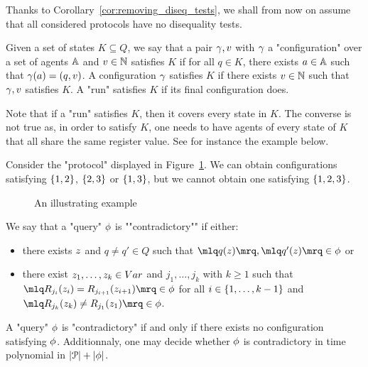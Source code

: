 Thanks to Corollary~\ref{cor:removing_diseq_tests}, we shall from now on assume that all considered protocols have no disequality tests. 

\begin{definition}
	Given a set of states $K \subseteq Q$, we say that a pair $\gamma, v$ with  $\gamma$ a "configuration" over a set of agents $\mathbb{A}$ and $v \in \mathbb{N}$ satisfies $K$ if for all $q \in K$, there exists $a \in \mathbb{A}$ such that $\gamma(a) = (q,v)$.
	A configuration $\gamma$ satisfies $K$ if there exists $v \in \mathbb{N}$ such that $\gamma, v $ satisfies $K$. 
	A "run" satisfies $K$ if its final configuration does.
\end{definition}
Note that if a "run" satisfies $K$, then it covers every state in $K$. The converse is not true as, in order to satisfy $K$, one needs to have agents of every state of $K$ that all share the same register value. See for instance the example below.

\begin{example}
	Consider the "protocol" displayed in Figure~\ref{fig:no-clique}.
	We can obtain configurations satisfying $\{1,2\}$, $\{2,3\}$ or $\{1,3\}$, but we cannot obtain one satisfying $\{1,2,3\}$.
	
	\begin{figure}[h]
		
		\caption{An illustrating example}
		\label{fig:no-clique}
	\end{figure}
\end{example}



\begin{definition}
	We say that a "query" $\phi$ is ""contradictory"" if either:
	\begin{itemize}
		\item there exists $\varz$ and $q \neq q' \in Q$ such that $\quotemarks{q(\varz)}, \quotemarks{q'(\varz)} \in \query$ or
		
		\item there exist $\var{z_1}, \ldots, \var{z_k} \in \varset$ and $j_1, \ldots, j_k$ with $k\geq 1$ such that $\quotemarks{R_{j_i}(\varz_{i}) = R_{j_{i+1}}(\varz_{i+1})} \in \query$ for all $i \in \{1,\ldots,k-1\}$ and $\quotemarks{R_{j_k}(\varz_k) \neq R_{j_1}(\varz_1)} \in \query$.
	\end{itemize}
\end{definition}

\begin{proposition}
	A "query" $\phi$ is "contradictory" if and only if there exists no configuration satisfying $\phi$. Additionnaly, one may decide whether $\phi$ is contradictory in time polynomial in $|\mathcal{P}| + |\phi|$. 
\end{proposition}

